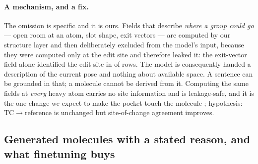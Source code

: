 \paragraph{A mechanism, and a fix.} The omission is specific and it is ours. Fields that describe
\emph{where a group could go} --- open room at an atom, slot shape, exit vectors --- are computed by
our structure layer and then deliberately excluded from the model's input, because they were
computed only at the edit site and therefore leaked it: the exit-vector field alone identified the
edit site in  of rows. The model is consequently handed a description of the current pose and
nothing about available space. A sentence can be grounded in that; a molecule cannot be derived from
it. Computing the same fields at \emph{every} heavy atom carries no site information and is
leakage-safe, and it is the one change we expect to make the pocket touch the molecule
; hypothesis: TC$\rightarrow$reference is unchanged but
site-of-change agreement improves.

\subsection{Generated molecules with a stated reason, and what finetuning buys}
\label{sec:gen}

